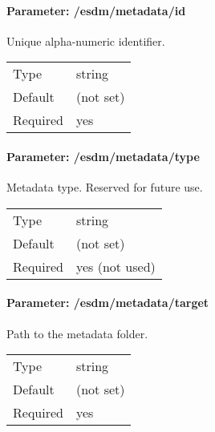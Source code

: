 \paragraph{Parameter: /esdm/metadata/id}
Unique alpha-numeric identifier.

\begin{preserve}
 \noindent
 \begin{tabular}{ll}
   Type     & string    \\ 
   Default  & (not set) \\ 
   Required & yes       \\ 
 \end{tabular} 
\end{preserve}
\FloatBarrier
\vspace{\gapsize}

\paragraph{Parameter: /esdm/metadata/type}
Metadata type. Reserved for future use.

\begin{preserve}
  \noindent
  \begin{tabular}{ll}
    Type     & string         \\ 
    Default  & (not set)      \\ 
    Required & yes (not used) \\ 
  \end{tabular}
\end{preserve}
\FloatBarrier
\vspace{\gapsize}

\paragraph{Parameter: /esdm/metadata/target}
Path to the metadata folder.

\begin{preserve}
  \noindent
  \begin{tabular}{ll}
    Type     & string         \\ 
    Default  & (not set)      \\ 
    Required & yes \\ 
  \end{tabular}
\end{preserve}
\FloatBarrier
\vspace{\gapsize}

